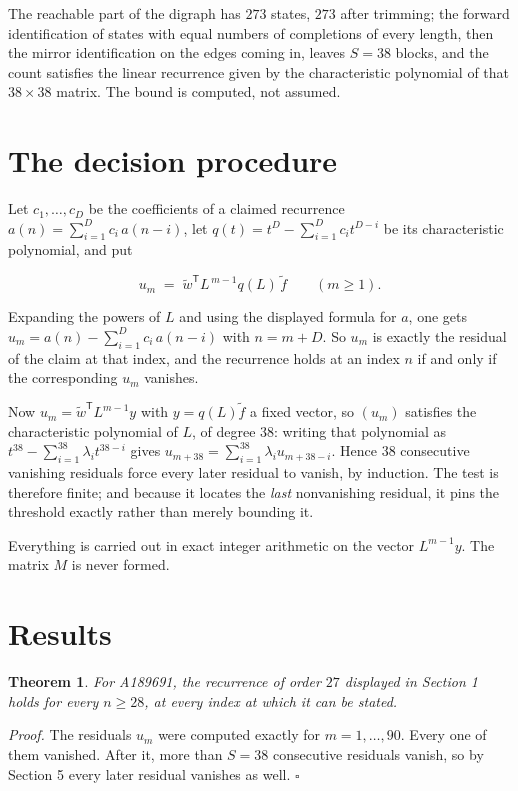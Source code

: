 \documentclass[11pt]{article}
\newtheorem{theorem}{Theorem}
\theoremstyle{definition}
\begin{document}
The reachable part of the digraph has $273$ states, $273$ after trimming; the forward identification of states with equal numbers of completions of every length, then the mirror identification on the edges coming in, leaves $S = 38$ blocks, and the count satisfies the linear recurrence given by the characteristic polynomial of that $38\times38$ matrix. The bound is computed, not assumed.

\section{The decision procedure}

Let $c_1,\dots,c_D$ be the coefficients of a claimed recurrence $a(n) = \sum_{i=1}^{D} c_i\,a(n-i)$, let $q(t) = t^{D} - \sum_{i=1}^{D} c_i t^{D-i}$ be its characteristic polynomial, and put

\[u_m \;=\; \tilde w^{\mathsf T} L^{\,m-1} q(L)\,\tilde f \qquad (m \ge 1).\]

Expanding the powers of $L$ and using the displayed formula for $a$, one gets $u_m = a(n) - \sum_{i=1}^{D} c_i\,a(n-i)$ with $n = m + D$. So $u_m$ is exactly the residual of the claim at that index, and the recurrence holds at an index $n$ if and only if the corresponding $u_m$ vanishes.

Now $u_m = \tilde w^{\mathsf T} L^{m-1} y$ with $y = q(L)\tilde f$ a fixed vector, so $(u_m)$ satisfies the characteristic polynomial of $L$, of degree $38$: writing that polynomial as $t^{38} - \sum_{i=1}^{38} \lambda_i t^{38-i}$ gives $u_{m+38} = \sum_{i=1}^{38} \lambda_i u_{m+38-i}$. Hence $38$ consecutive vanishing residuals force every later residual to vanish, by induction. The test is therefore finite; and because it locates the {\itshape last} nonvanishing residual, it pins the threshold exactly rather than merely bounding it.

Everything is carried out in exact integer arithmetic on the vector $L^{m-1}y$. The matrix $M$ is never formed.

\section{Results}

\begin{theorem} For A189691, the recurrence of order $27$ displayed in Section 1 holds for every $n \ge 28$, at every index at which it can be stated.\end{theorem}

{\itshape Proof.} The residuals $u_m$ were computed exactly for $m = 1,\dots,90$. Every one of them vanished. After it, more than $S = 38$ consecutive residuals vanish, so by Section 5 every later residual vanishes as well. $\square$
\end{document}
